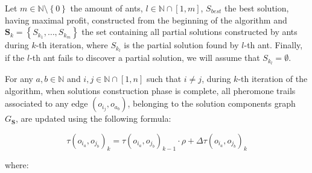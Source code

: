 \documentclass[12pt,a4paper]{report}
\newcommand{\N}{\mathbb{N}}
\newcommand{\SetMinusZero}{\setminus \left\{0\right\}}
\newcommand{\SetFromOneTo}[1]{\N \cap \left[1,#1\right]}
\begin{document}
Let $m \in \N \SetMinusZero$ the amount of ants, $l \in \SetFromOneTo{m}$, $S_{best}$ the best solution, having maximal profit, constructed from the beginning of the algorithm and $\textbf{S}_k = \left\{S_{k_1}, \ldots, S_{k_m} \right\}$ the set containing all partial solutions constructed by ants during $k$-th iteration, where $S_{k_l}$ is the partial solution found by $l$-th ant. Finally, if the $l$-th ant fails to discover a partial solution, we will assume that $S_{k_l} = \emptyset$. 

For any $a,b \in \N$ and $i,j \in \SetFromOneTo{n}$ such that $i \neq j$, during $k$-th iteration of the algorithm, when solutions construction phase is complete, all pheromone trails associated to any edge $(o_{i_j}, o_{a_b})$, belonging to the solution components graph $G_{\textbf{S}}$, are updated using the following formula:

\begin{equation}
	\tau(o_{i_a}, o_{j_b})_k = \tau(o_{i_a}, o_{j_b})_{k-1} \cdot \rho + \Delta \tau(o_{i_a}, o_{j_b})_{k} 
\end{equation}

where:
\end{document}
